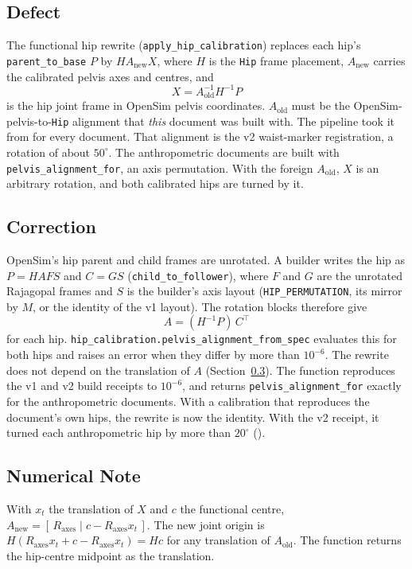 \documentclass[11pt]{article}
\begin{document}
\subsection{Defect}
The functional hip rewrite (\texttt{apply\_hip\_calibration}) replaces each
hip's \texttt{parent\_to\_base} $P$ by $H A_{\mathrm{new}} X$, where $H$ is
the \texttt{Hip} frame placement, $A_{\mathrm{new}}$ carries the calibrated
pelvis axes and centres, and
\begin{equation}
  X = A_{\mathrm{old}}^{-1} H^{-1} P
\end{equation}
is the hip joint frame in OpenSim pelvis coordinates. $A_{\mathrm{old}}$
must be the OpenSim-pelvis-to-\texttt{Hip} alignment that \emph{this}
document was built with. The pipeline took it from
 for every document. That alignment is the v2
waist-marker registration, a rotation of about $50^\circ$. The
anthropometric documents are built with \texttt{pelvis\_alignment\_for}, an
axis permutation. With the foreign $A_{\mathrm{old}}$, $X$ is an arbitrary
rotation, and both calibrated hips are turned by it.

\subsection{Correction}
OpenSim's hip parent and child frames are unrotated. A builder writes the hip
as $P = H A F S$ and $C = G S$ (\texttt{child\_to\_follower}), where $F$ and
$G$ are the unrotated Rajagopal frames and $S$ is the builder's axis layout
(\texttt{HIP\_PERMUTATION}, its mirror by $M$, or the identity of the v1
layout). The rotation blocks therefore give
\begin{equation}
  A = (H^{-1} P)\, C^{\top}
\end{equation}
for each hip. \texttt{hip\_calibration.pelvis\_alignment\_from\_spec}
evaluates this for both hips and raises an error when they differ by more
than $10^{-6}$. The rewrite does not depend on the translation of $A$
(Section~\ref{sec:numerics-12109}). The function reproduces the v1 and v2
build receipts to $10^{-6}$, and returns \texttt{pelvis\_alignment\_for}
exactly for the anthropometric documents. With a calibration that reproduces
the document's own hips, the rewrite is now the identity. With the v2
receipt, it turned each anthropometric hip by more than $20^\circ$
().

\subsection{Numerical Note}\label{sec:numerics-12109}
With $x_t$ the translation of $X$ and $c$ the functional centre,
$A_{\mathrm{new}} = [\,R_{\mathrm{axes}} \mid c - R_{\mathrm{axes}} x_t\,]$.
The new joint origin is $H(R_{\mathrm{axes}} x_t + c - R_{\mathrm{axes}}
x_t) = Hc$ for any translation of $A_{\mathrm{old}}$. The function returns
the hip-centre midpoint as the translation.
\end{document}
